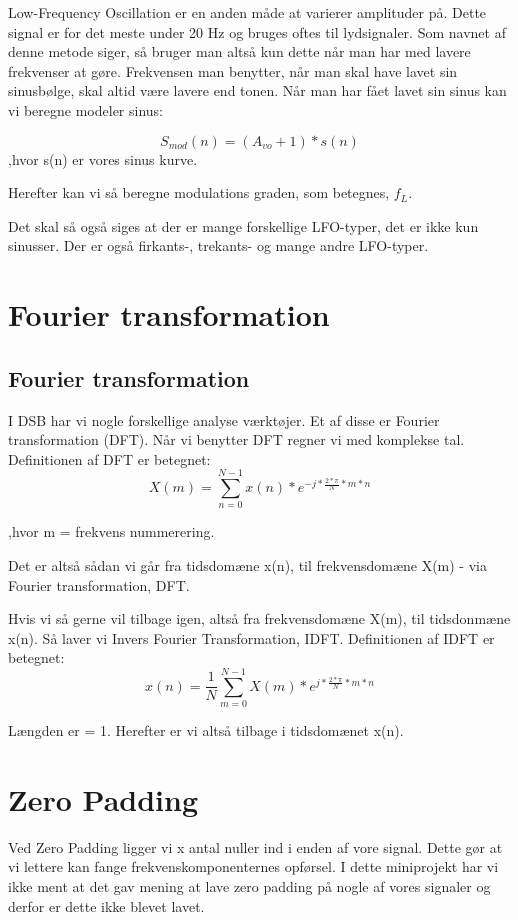 \documentclass[12pt, letterpaper]{article}
\begin{document}
Low-Frequency Oscillation er en anden måde at varierer amplituder på. 
Dette signal er for det meste under 20 Hz og bruges oftes til lydsignaler. Som navnet af denne metode siger, så bruger man altså kun dette når man har med lavere frekvenser at gøre. Frekvensen man benytter, når man skal have lavet sin sinusbølge, skal altid være lavere end tonen. 
Når man har fået lavet sin sinus kan vi beregne modeler sinus: 

$$S_{mod} (n) = (A_{vo} + 1)*s(n)$$
,hvor s(n) er vores sinus kurve. 

Herefter kan vi så beregne modulations graden, som betegnes, $f_L$.

Det skal så også siges at der er mange forskellige LFO-typer, det er ikke kun sinusser. Der er også firkants-, trekants-  og mange andre LFO-typer. 


\section{Fourier transformation}

\subsection{Fourier transformation}


I DSB har vi nogle forskellige analyse værktøjer. Et af disse er Fourier transformation (DFT). Når vi benytter DFT regner vi med komplekse tal. 
Definitionen af DFT er betegnet: 
$$X(m)= \sum\limits_{n=0}^{N-1} x(n)*e^{-j*\frac{2*\pi}{N}*m*n}$$

,hvor m = frekvens nummerering. 


Det er altså sådan vi går fra tidsdomæne x(n), til frekvensdomæne X(m) - via Fourier transformation, DFT. 

Hvis vi så gerne vil tilbage igen, altså fra frekvensdomæne X(m), til tidsdonmæne x(n). Så laver vi Invers Fourier Transformation, IDFT. 
Definitionen af IDFT er betegnet: 
$$x(n)= \frac{1}{N} \sum\limits_{m=0}^{N-1} X(m)*e^{j*\frac{2*\pi}{N}*m*n}$$

Længden er = 1. 
Herefter er vi altså tilbage i tidsdomænet x(n).

\section{Zero Padding}
Ved Zero Padding ligger vi x antal nuller ind i enden af vore signal. 
Dette gør at vi lettere kan fange frekvenskomponenternes opførsel.
I dette miniprojekt har vi ikke ment at det gav mening at lave zero padding på nogle af vores signaler og derfor er dette ikke blevet lavet.  
\end{document}
